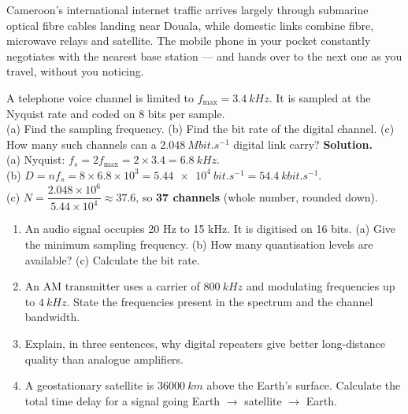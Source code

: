 \documentclass[11pt]{article}
\begin{document}
\begin{savaistu}
Cameroon's international internet traffic arrives largely through submarine optical fibre cables landing near Douala, while domestic links combine fibre, microwave relays and satellite. The mobile phone in your pocket constantly negotiates with the nearest base station --- and hands over to the next one as you travel, without you noticing.
\end{savaistu}

\begin{exoresolu}
A telephone voice channel is limited to $f_{\max} = \SI{3.4}{kHz}$. It is sampled at the Nyquist rate and coded on 8 bits per sample.\\
(a) Find the sampling frequency. (b) Find the bit rate of the digital channel. (c) How many such channels can a $\SI{2.048}{Mbit.s^{-1}}$ digital link carry?
\tcblower
\textbf{Solution.}\\
(a) Nyquist: $f_s = 2 f_{\max} = 2 \times 3.4 = \SI{6.8}{kHz}$.\\
(b) $D = n f_s = 8 \times 6.8\times10^{3} = \SI{5.44e4}{bit.s^{-1}} = \SI{54.4}{kbit.s^{-1}}$.\\
(c) $N = \dfrac{2.048\times10^{6}}{5.44\times10^{4}} \approx 37.6$, so \textbf{37 channels} (whole number, rounded down).
\end{exoresolu}

\begin{exercice}[Practice]
\begin{enumerate}
\item An audio signal occupies 20 Hz to 15 kHz. It is digitised on 16 bits. (a) Give the minimum sampling frequency. (b) How many quantisation levels are available? (c) Calculate the bit rate.
\item An AM transmitter uses a carrier of $\SI{800}{kHz}$ and modulating frequencies up to $\SI{4}{kHz}$. State the frequencies present in the spectrum and the channel bandwidth.
\item Explain, in three sentences, why digital repeaters give better long-distance quality than analogue amplifiers.
\item A geostationary satellite is $\SI{36000}{km}$ above the Earth's surface. Calculate the total time delay for a signal going Earth $\to$ satellite $\to$ Earth.
\end{enumerate}
\end{exercice}
\end{document}
